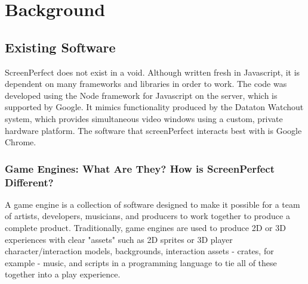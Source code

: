 
\chapter{Background} %

\label{Chapter2} %




\section{Existing Software}
ScreenPerfect does not exist in a void. Although written fresh in Javascript, it is dependent on many frameworks and libraries in order to work. The code was developed using the Node framework for Javascript on the server, which is supported by Google. It mimics functionality produced by the Dataton Watchout system, which provides simultaneous video windows using a custom, private hardware platform. The software that screenPerfect interacts best with is Google Chrome.

\subsection{Game Engines: What Are They? How is ScreenPerfect Different?}

A game engine is a collection of software designed to make it possible for a team of artists, developers, musicians, and producers to work together to produce a complete product. Traditionally, game engines are used to produce 2D or 3D experiences with clear "assets" such as 2D sprites or 3D player character/interaction models, backgrounds, interaction assets - crates, for example - music, and scripts in a programming language to tie all of these together into a play experience.

